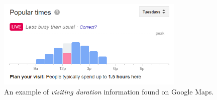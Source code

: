 \documentclass{ws-ijait}
\begin{document}
	\begin{figure}[!ht]
		\centering
		\includegraphics[width=0.8\textwidth]{../graphics/google_visit_duration.png}
		\caption{An example of \textit{visiting duration} information found on Google Maps.}
		\label{fig:visit_duration}
	\end{figure}
	
\end{document}
